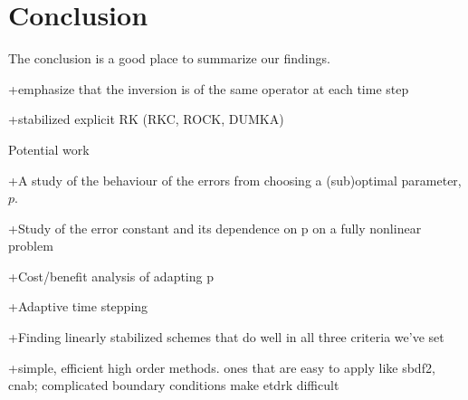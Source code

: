 \chapter{Conclusion}
The conclusion is a good place to summarize our findings.

+emphasize that the inversion is of the same operator at each time step
	
+stabilized explicit RK (RKC, ROCK, DUMKA)

\noindent	
Potential work

+A study of the behaviour of the errors from choosing a (sub)optimal parameter, $p$.

+Study of the error constant and its dependence on p on a fully nonlinear problem 

+Cost/benefit analysis of adapting p

+Adaptive time stepping

+Finding linearly stabilized schemes that do well in all three criteria we've set

+simple, efficient high order methods. ones that are easy to apply like sbdf2, cnab; complicated boundary conditions make etdrk difficult
